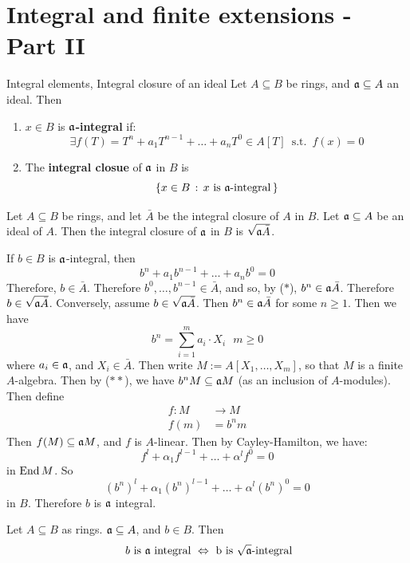 \documentclass{article}
\begin{document}
\section{Integral and finite extensions - Part II}
\begin{fancydefine}{Integral elements, Integral closure of an ideal}
    Let $A \subseteq B$ be rings, and $\mathfrak{a} \subseteq A$ an ideal. Then \begin{enumerate}
        \item $x \in B$ is $\mathfrak{a}$\textbf{-integral} if: \[ \exists f(T) = T^{n} + a_{1}T^{n-1} + \dots + a_{n}T^{0} \in A[T] \,\,\, \text{s.t.}\,\,\, f(x)=0\]
        \item The \textbf{integral closue} of $\mathfrak{a}$ in $B$ is \[ \{x \in B \, : \, x \text{ is $\mathfrak{a}$-integral}\,\}\]
    \end{enumerate}
\end{fancydefine}
\begin{fancyprop}{}
    Let $A \subseteq B$ be rings, and let $\bar A$ be the integral closure of $A$ in $B$. Let $\mathfrak{a} \subseteq A$ be an ideal of $A$. Then the integral closure of $\mathfrak{a}$ in $B$ is $\sqrt{\mathfrak{a} \bar A}$.
\end{fancyprop}
\proof If $b \in B$ is $\mathfrak{a}$-integral, then \[ b^{n} + a_{1}b^{n-1} + \dots + a_{n}b^{0} = 0 \tag{$*$}\] Therefore, $b \in \bar A$. Therefore $b^{0}, \dots, b^{n-1} \in \bar A$, and so, by ($*$), $b^{n} \in \mathfrak{a} \bar A$. Therefore $b \in \sqrt{\mathfrak{a} \bar A}$.\gap 
Conversely, assume $b \in \sqrt{\mathfrak{a} \bar A}$. Then $b^{n} \in \mathfrak{a} \bar A$ for some $n \geq 1$. Then we have \[ b^{n} = \sum_{i=1}^{m} a_{i} \cdot X_{i} \,\,\,\, m \geq 0 \tag{$**$}\] where $a_{i} \in \mathfrak{a}$, and $X_{i} \in \bar A$. Then write $M := A[X_{1}, \dots, X_{m}]$, so that $M$ is a finite $A$-algebra. Then by ($**$), we have $b^{n}M \subseteq \mathfrak{a} M$ (as an inclusion of $A$-modules). Then define \begin{align*}
    f: M &\to M\\
    f(m) &=b^{n}m
\end{align*}
Then $f(M) \subseteq \mathfrak{a} M$, and $f$ is $A$-linear. Then by Cayley-Hamilton, we have: \[ f^{l} + \alpha_{1} f^{l-1} + \dots + \alpha^{l} f^{0}  = 0\] in $\operatorname{End} M$. So \[(b^{n})^{l} + \alpha_{1}(b^{n})^{l-1} + \dots + \alpha^{l}(b^{n})^{0} = 0\] in $B$. Therefore $b$ is $\mathfrak{a}$ integral. \endproof
\begin{corr}{}
    Let $A \subseteq B$ as rings. $\mathfrak{a} \subseteq A$, and $b \in B$. Then \[ \text{ $b$ is $\mathfrak{a}$ integral } \Leftrightarrow \text{ b is $\sqrt{\mathfrak{a}}$-integral}\]
\end{corr}
\end{document}
